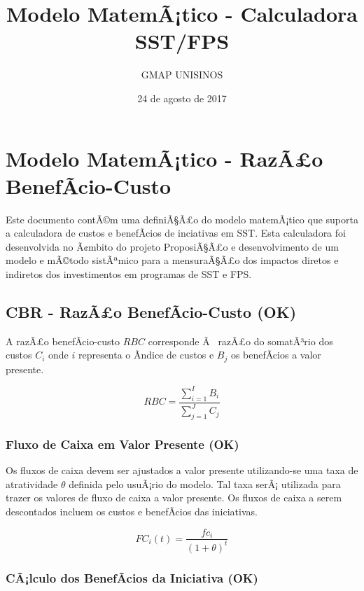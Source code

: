 \documentclass[]{article}
\title{Modelo MatemÃ¡tico - Calculadora SST/FPS}
\author{GMAP \textbar{} UNISINOS}
\date{24 de agosto de 2017}
\begin{document}
\maketitle

{
\setcounter{tocdepth}{6}
\tableofcontents
}
\section{Modelo MatemÃ¡tico - RazÃ£o
BenefÃ­cio-Custo}\label{modelo-matematico---razao-benefacio-custo}

Este documento contÃ©m uma definiÃ§Ã£o do modelo matemÃ¡tico que suporta
a calculadora de custos e benefÃ­cios de inciativas em SST. Esta
calculadora foi desenvolvida no Ã¢mbito do projeto ProposiÃ§Ã£o e
desenvolvimento de um modelo e mÃ©todo sistÃªmico para a mensuraÃ§Ã£o
dos impactos diretos e indiretos dos investimentos em programas de SST e
FPS.

\subsection{CBR - RazÃ£o BenefÃ­cio-Custo
(OK)}\label{cbr---razao-benefacio-custo-ok}

A razÃ£o benefÃ­cio-custo \({RBC}\) corresponde Ã~ razÃ£o do somatÃ³rio
dos custos \(C_i\) onde \(i\) representa o Ã­ndice de custos e \(B_j\)
os benefÃ­cios a valor presente.

\[{RBC} = \frac{\sum_{i=1}^{I} B_{i}} {\sum_{j=1}^{J} C_{j}}\]

\subsubsection{Fluxo de Caixa em Valor Presente
(OK)}\label{fluxo-de-caixa-em-valor-presente-ok}

Os fluxos de caixa devem ser ajustados a valor presente utilizando-se
uma taxa de atratividade \(\theta\) definida pelo usuÃ¡rio do modelo.
Tal taxa serÃ¡ utilizada para trazer os valores de fluxo de caixa a
valor presente. Os fluxos de caixa a serem descontados incluem os custos
e benefÃ­cios das iniciativas.

\[FC_i(t) = \frac{fc_i}{(1+\theta)^t}\]

\subsubsection{CÃ¡lculo dos BenefÃ­cios da Iniciativa
(OK)}\label{calculo-dos-benefacios-da-iniciativa-ok}
\end{document}
